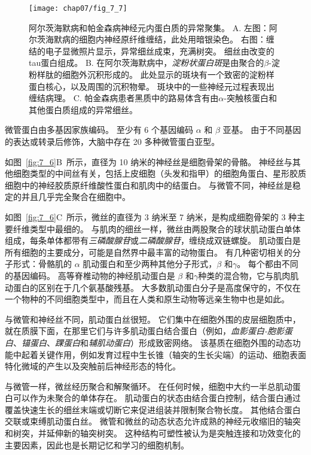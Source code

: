\begin{figure}[htbp]
	\centering
	\texttt{[image: chap07/fig\_7\_7]}
	\caption{阿尔茨海默病和帕金森病神经元内蛋白质的异常聚集。
	A. 左图：阿尔茨海默病的细胞内神经原纤维缠结，此处用暗银染色。
	右图：缠结的电子显微照片显示，异常细丝成束，充满树突。
	细丝由改变的tau蛋白组成。
	B. 在阿尔茨海默病中，\textit{淀粉状蛋白斑}是由聚合的$\beta$-淀粉样肽的细胞外沉积形成的。
	此处显示的斑块有一个致密的淀粉样蛋白核心，以及周围的沉积物晕。
	斑块中的一些神经元过程表现出缠结病理。
	C. 帕金森病患者黑质中的路易体含有由$\alpha$-突触核蛋白和其他蛋白质组成的异常细丝。}
	\label{fig:7_7}
\end{figure}


微管蛋白由多基因家族编码。
至少有 6 个基因编码 $\alpha$ 和 $\beta$ 亚基。
由于不同基因的表达或转录后修饰，大脑中存在 20 多种微管蛋白亚型。


如图~\ref{fig:7_6}B~所示，直径为 10 纳米的神经丝是细胞骨架的骨骼。
神经丝与其他细胞类型的中间丝有关，包括上皮细胞（头发和指甲）的细胞角蛋白、星形胶质细胞中的神经胶质原纤维酸性蛋白和肌肉中的结蛋白。
与微管不同，神经丝是稳定的并且几乎完全聚合在细胞中。


如图~\ref{fig:7_6}C~所示，微丝的直径为 3 纳米至 7 纳米，是构成细胞骨架的 3 种主要纤维类型中最细的。
与肌肉的细丝一样，微丝由两股聚合的球状肌动蛋白单体组成，每条单体都带有\textit{三磷酸腺苷}或\textit{二磷酸腺苷}，缠绕成双链螺旋。
肌动蛋白是所有细胞的主要成分，可能是自然界中最丰富的动物蛋白。
有几种密切相关的分子形式：骨骼肌的 $\alpha$ 肌动蛋白和至少两种其他分子形式，$\beta$ 和$\gamma$。
每个都由不同的基因编码。
高等脊椎动物的神经肌动蛋白是 $\beta$ 和$\gamma$种类的混合物，它与肌肉肌动蛋白的区别在于几个氨基酸残基。 
大多数肌动蛋白分子是高度保守的，不仅在一个物种的不同细胞类型中，而且在人类和原生动物等远亲生物中也是如此。


与微管和神经丝不同，肌动蛋白丝很短。
它们集中在细胞外围的皮层细胞质中，就在质膜下面，在那里它们与许多肌动蛋白结合蛋白（例如，\textit{血影蛋白-胞影蛋白}、\textit{锚蛋白}、\textit{踝蛋白}和\textit{辅肌动蛋白}）形成致密网络。
该基质在细胞外围的动态功能中起着关键作用，例如发育过程中生长锥（轴突的生长尖端）的运动、细胞表面特化微域的产生以及突触前后神经形态的特化。


与微管一样，微丝经历聚合和解聚循环。
在任何时候，细胞中大约一半总肌动蛋白可以作为未聚合的单体存在。
肌动蛋白的状态由结合蛋白控制，结合蛋白通过覆盖快速生长的细丝末端或切断它来促进组装并限制聚合物长度。 
其他结合蛋白交联或束缚肌动蛋白丝。
微管和微丝的动态状态允许成熟的神经元收缩旧的轴突和树突，并延伸新的轴突树突。
这种结构可塑性被认为是突触连接和功效变化的主要因素，因此也是长期记忆和学习的细胞机制。




